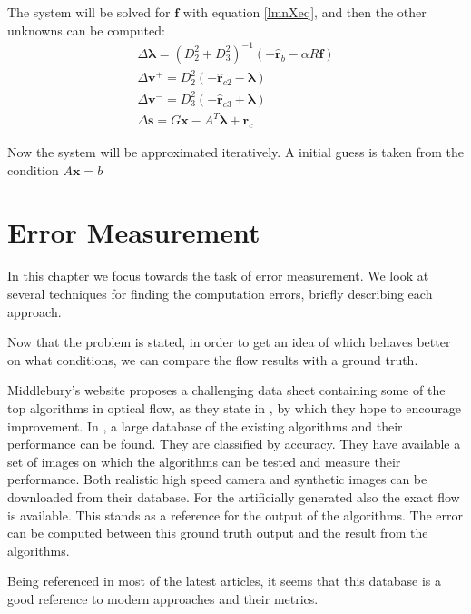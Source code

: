 \documentclass[12pt,a4paper,twoside]{report}
\begin{document}
{ The system will be solved for $\boldsymbol{f}$ with equation  \ref{lmnXeq}, and then the other unknowns can be computed:
 \begin{equation} \label{lmnReq}
 	\begin{split}
 	\Delta\boldsymbol{\lambda} = ( D_2^{2} +  D_3^{2} )^{-1}
 	(-\hat{\boldsymbol{r}}_{b} - \alpha R \boldsymbol{f})\\
 	\Delta\boldsymbol{v}^+ = D_2^{2}(-\hat{\boldsymbol{r}}_{c2} - \boldsymbol{\lambda})\\
	\Delta\boldsymbol{v}^- = D_3^{2}(-\hat{\boldsymbol{r}}_{c3} + \boldsymbol{\lambda})\\
 	\Delta\boldsymbol{s} =  G  \boldsymbol{x} -  A^T\boldsymbol{\lambda} + \boldsymbol{r}_c
 	\end{split}
 \end{equation}
 
 Now the system will be approximated iteratively. A initial guess is taken from the condition $A\boldsymbol{x} = b$ 




\section{Error Measurement}

In this chapter we focus towards the task of error measurement. We look at several techniques for finding the computation errors, briefly describing each approach. 

Now that the problem is stated, in order to get an idea of which behaves better on what conditions, we can compare the flow results with a ground truth.

 Middlebury's website\cite{middleburry} proposes a challenging data sheet containing some of the top algorithms in optical flow, as they state in \cite{baker2011database}, by which they hope to encourage improvement. In \cite{middleburry}, a large database of the existing algorithms and their performance can be found. They are classified by accuracy.
They have available a set of images on which the algorithms can be tested and measure their performance. Both realistic high speed camera and synthetic images can be downloaded from their database. For the artificially generated also the exact flow is available. This stands as a reference for the output of the algorithms. The error can be computed between this ground truth output and the result from the algorithms.

 Being referenced in most of the latest articles, it seems that this database is a good reference to modern approaches and their metrics.

}
\end{document}
